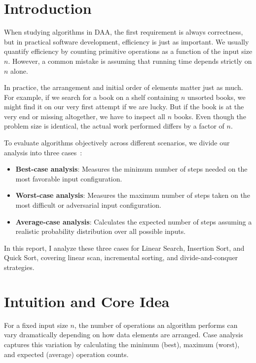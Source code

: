 \documentclass[11pt,a4paper]{article}
\begin{document}
\tableofcontents
\newpage

\section{Introduction}

When studying algorithms in DAA, the first requirement is always correctness, but in
practical software development, efficiency is just as important. We usually quantify
efficiency by counting primitive operations as a function of the input size $n$.
However, a common mistake is assuming that running time depends strictly on $n$ alone.

In practice, the arrangement and initial order of elements matter just as much. For
example, if we search for a book on a shelf containing $n$ unsorted books, we might
find it on our very first attempt if we are lucky. But if the book is at the very end
or missing altogether, we have to inspect all $n$ books. Even though the problem size
is identical, the actual work performed differs by a factor of $n$.

To evaluate algorithms objectively across different scenarios, we divide our analysis
into three cases~\cite{cormen2022}:
\begin{itemize}
  \item \textbf{Best-case analysis}: Measures the minimum number of steps needed on the
        most favorable input configuration.
  \item \textbf{Worst-case analysis}: Measures the maximum number of steps taken on the
        most difficult or adversarial input configuration.
  \item \textbf{Average-case analysis}: Calculates the expected number of steps assuming
        a realistic probability distribution over all possible inputs.
\end{itemize}

In this report, I analyze these three cases for Linear Search, Insertion Sort, and Quick
Sort, covering linear scan, incremental sorting, and divide-and-conquer strategies.

\section{Intuition and Core Idea}

\begin{keyidea}
For a fixed input size $n$, the number of operations an algorithm performs can vary
dramatically depending on how data elements are arranged. Case analysis captures this
variation by calculating the minimum (best), maximum (worst), and expected (average)
operation counts.
\end{keyidea}
\end{document}
